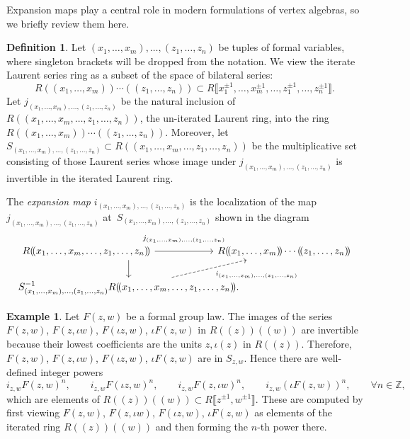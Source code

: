 \documentclass[pdftex]{sigma}
\numberwithin{equation}{section}
\theoremstyle{definition}
\newtheorem{Definition}[Theorem]{Definition}
\newtheorem{Example}[Theorem]{Example}
\def\lb{\llbracket}
\def\rb{\rrbracket}
\begin{document}
Expansion maps play a central role in modern formulations of vertex algebras, so we briefly review them here.

\begin{Definition}
Let $(x_1, \dots, x_m), \dots, (z_1, \dots, z_n)$ be tuples of formal variables, where singleton brackets will be dropped from the notation. We view the iterate Laurent series ring as a subset of the space of bilateral series:
\[
 R(\!( x_1,\dots, x_m)\!)\cdots(\!( z_1,\dots, z_n)\!)\subset R\big\lb x_1^{\pm1},\dots,x_m^{\pm1},\dots, z_1^{\pm1},\dots,z_n^{\pm1}\big\rb.
\]
Let $j_{(x_1,\dots, x_m),\dots, (z_1,\dots, z_n)}$ be the natural inclusion of $R(\!( x_1,\dots,x_m,\dots,z_1,\dots,z_n)\!)$, the un-iterated Laurent ring, into the ring $R(\!( x_1,\dots, x_m)\!)\cdots(\!( z_1,\dots, z_n)\!)$. Moreover, let $S_{(x_1,\dots, x_m),\dots, (z_1,\dots, z_n)}\subset R(\!( x_1,\dots,x_m,\dots,z_1,\dots,z_n)\!)$ be the multiplicative set consisting of those Laurent series whose image under $j_{(x_1,\dots, x_m),\dots, (z_1,\dots, z_n)}$ is invertible in the iterated Laurent ring.

The \emph{expansion map} $i_{(x_1,\dots, x_m),\dots, (z_1,\dots, z_n)}$ is the localization of the map $j_{(x_1,\dots, x_m),\dots, (z_1,\dots, z_n)}$ at~${S_{(x_1,\dots, x_m),\dots, (z_1,\dots, z_n)}}$ shown in the diagram
\[
\begin{tikzcd}[column sep=-7ex]
\hskip-3cm R(\!( x_1,\dots,x_m,\dots,z_1,\dots,z_n)\!)\dar\arrow[r,"j_{(x_1,\dots, x_m),\dots, (z_1,\dots, z_n)}" yshift=1.5ex]& R(\!( x_1,\dots, x_m)\!)\cdots(\!( z_1,\dots, z_n)\!)\\
S_{(x_1,\dots, x_m),\dots, (z_1,\dots, z_n)}^{-1}R(\!( x_1,\dots,x_m,\dots,z_1,\dots,z_n)\!).\arrow[ru,dashed,"i_{(x_1,\dots, x_m),\dots, (z_1,\dots, z_n)}"' xshift=1ex]
\end{tikzcd}
\]
\end{Definition}

\begin{Example}
\label{Ex_Main_Example_Expansions}
Let $F(z,w)$ be a formal group law. The images of the series $F(z,w)$, $F(z,\iota w)$, $F(\iota z,w)$, $\iota F(z,w)$ in $R(\!( z)\!)(\!( w)\!)$ are invertible because their lowest coefficients are the units $z,\iota(z)$ in $R(\!( z)\!)$. Therefore, $F(z,w)$, $F(z,\iota w)$, $F(\iota z,w)$, $\iota F(z,w)$ are in $S_{z,w}$. Hence there are well-defined integer powers
\[
 i_{z,w}F(z,w)^n,\qquad i_{z,w}F(\iota z,w)^n,\qquad i_{z,w}F(z,\iota w)^n,\qquad i_{z,w}(\iota F(z,w))^n,\qquad \forall n\in\mathbb{Z},
\]
which are elements of $R(\!( z)\!)(\!( w)\!)\subset R\big\lb z^{\pm1}, w^{\pm 1}\big\rb$. These are computed by first viewing $F(z,w)$, $F(z,\iota w)$, $F(\iota z,w)$, $\iota F(z,w)$ as elements of the iterated ring $R(\!( z)\!)(\!( w)\!)$ and then forming the $n$-th power there.
\end{Example}
\end{document}

